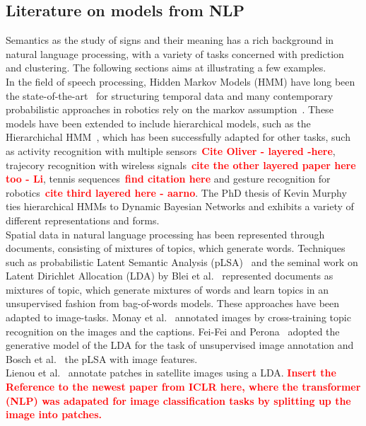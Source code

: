 \documentclass[twocolumn,letterpaper]{IEEEAerospaceCLS}  %
\newcommand\todo[1]{\textbf{\textcolor{red}{#1}}}
\begin{document}
\subsection{Literature on models from NLP}
Semantics as the study of signs and their meaning has a rich background in natural language processing, with a variety of tasks concerned with prediction and clustering. The following sections aims at illustrating a few examples.\\
In the field of speech processing, Hidden Markov Models (HMM) have long been the state-of-the-art~\cite{rabiner_tutorial_1989} for structuring temporal data and many contemporary probabilistic approaches in robotics rely on the markov assumption~\cite{thrun_probabilistic_2005}. These models have been extended to include hierarchical models, such as the Hierarchichal HMM~\cite{fine_hierarchical_1998}, which has been successfully adapted for other tasks, such as activity recognition with multiple sensors~\todo{Cite Oliver - layered -here}, trajecory recognition with wireless signals~\todo{cite the other layered paper here too - Li}, tennis sequences~\todo{find citation here} and gesture recognition for robotics~\todo{cite third layered here - aarno}. The PhD thesis of Kevin Murphy~\cite{murphy_dynamic_2002} ties hierarchical HMMs to Dynamic Bayesian Networks and exhibits a variety of different representations and forms.\\
Spatial data in natural language processing has been represented through documents, consisting of mixtures of topics, which generate words. Techniques such as probabilistic Latent Semantic Analysis (pLSA)~\cite{hofmann_probabilistic_1999} and the seminal work on Latent Dirichlet Allocation (LDA) by Blei et al.~\cite{blei_latent_2003} represented documents as mixtures of topic, which generate mixtures of words and learn topics in an unsupervised fashion from bag-of-words models. These approaches have been adapted to image-tasks. Monay et al.~\cite{monay_plsa-based_2004} annotated images by cross-training topic recognition on the images and the captions. Fei-Fei and Perona~\cite{fei-fei_bayesian_2005} adopted the generative model of the LDA for the task of unsupervised image annotation and Bosch et al.~\cite{bosch_scene_2006} the pLSA with image features.\\
Lienou et al.~\cite{lienou_semantic_2010} annotate patches in satellite images using a LDA.
\todo{Insert the Reference to the newest paper from ICLR here, where the transformer (NLP) was adapated for image classification tasks by splitting up the image into patches.}
\end{document}
